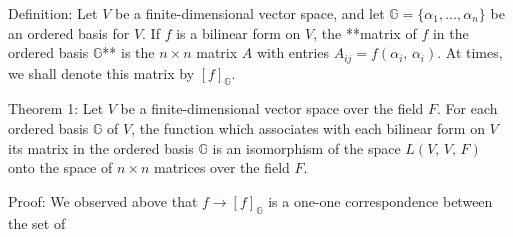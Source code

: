 Definition: Let \(V\) be a finite-dimensional vector space, and let \(\mathbb{G}=\{\alpha_{1},\ldots,\alpha_{n}\}\) be an ordered basis for \(V\). If \(f\) is a bilinear form on \(V\), the **matrix of \(f\) in the ordered basis \(\mathbb{G}\)** is the \(n\times n\) matrix \(A\) with entries \(A_{ij}=f(\alpha_{i},\,\alpha_{i})\). At times, we shall denote this matrix by \([f]_{\mathbb{G}}\).

Theorem 1: Let \(V\) be a finite-dimensional vector space over the field \(F\). For each ordered basis \(\mathbb{G}\) of \(V\), the function which associates with each bilinear form on \(V\) its matrix in the ordered basis \(\mathbb{G}\) is an isomorphism of the space \(L(V,\,V,\,F)\) onto the space of \(n\times n\) matrices over the field \(F\).

Proof: We observed above that \(f\mathop{\rightarrow}\limits[f]_{\mathbb{G}}\) is a one-one correspondence between the set of 